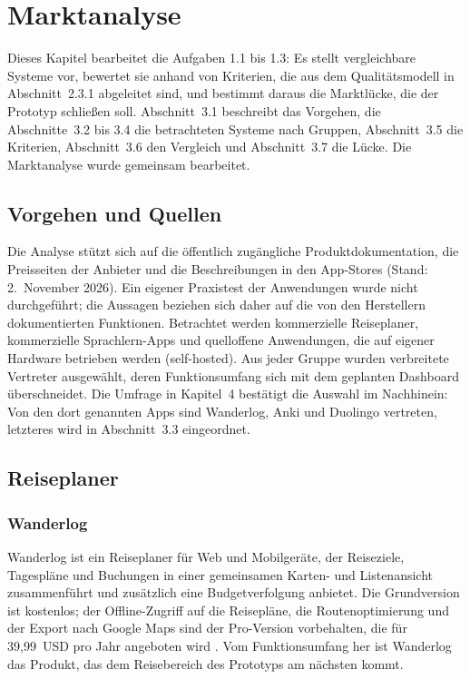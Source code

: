 \documentclass[12pt,a4paper]{scrreprt}
\begin{document}
\chapter{Marktanalyse}
Dieses Kapitel bearbeitet die Aufgaben 1.1 bis 1.3: Es stellt vergleichbare Systeme vor, bewertet sie anhand von Kriterien, die aus dem Qualitätsmodell in Abschnitt~2.3.1 abgeleitet sind, und bestimmt daraus die Marktlücke, die der Prototyp schließen soll. Abschnitt~3.1 beschreibt das Vorgehen, die Abschnitte~3.2 bis 3.4 die betrachteten Systeme nach Gruppen, Abschnitt~3.5 die Kriterien, Abschnitt~3.6 den Vergleich und Abschnitt~3.7 die Lücke. Die Marktanalyse wurde gemeinsam bearbeitet.

\section{Vorgehen und Quellen}
Die Analyse stützt sich auf die öffentlich zugängliche Produktdokumentation, die Preisseiten der Anbieter und die Beschreibungen in den App-Stores (Stand: 2.~November 2026). Ein eigener Praxistest der Anwendungen wurde nicht durchgeführt; die Aussagen beziehen sich daher auf die von den Herstellern dokumentierten Funktionen. Betrachtet werden kommerzielle Reiseplaner, kommerzielle Sprachlern-Apps und quelloffene Anwendungen, die auf eigener Hardware betrieben werden (self-hosted). Aus jeder Gruppe wurden verbreitete Vertreter ausgewählt, deren Funktionsumfang sich mit dem geplanten Dashboard überschneidet. Die Umfrage in Kapitel~4 bestätigt die Auswahl im Nachhinein: Von den dort genannten Apps sind Wanderlog, Anki und Duolingo vertreten, letzteres wird in Abschnitt~3.3 eingeordnet.

\section{Reiseplaner}

\subsection{Wanderlog}
Wanderlog ist ein Reiseplaner für Web und Mobilgeräte, der Reiseziele, Tagespläne und Buchungen in einer gemeinsamen Karten- und Listenansicht zusammenführt und zusätzlich eine Budgetverfolgung anbietet. Die Grundversion ist kostenlos; der Offline-Zugriff auf die Reisepläne, die Routenoptimierung und der Export nach Google Maps sind der Pro-Version vorbehalten, die für 39,99~USD pro Jahr angeboten wird \cite{wanderlogpro}. Vom Funktionsumfang her ist Wanderlog das Produkt, das dem Reisebereich des Prototyps am nächsten kommt.
\end{document}
